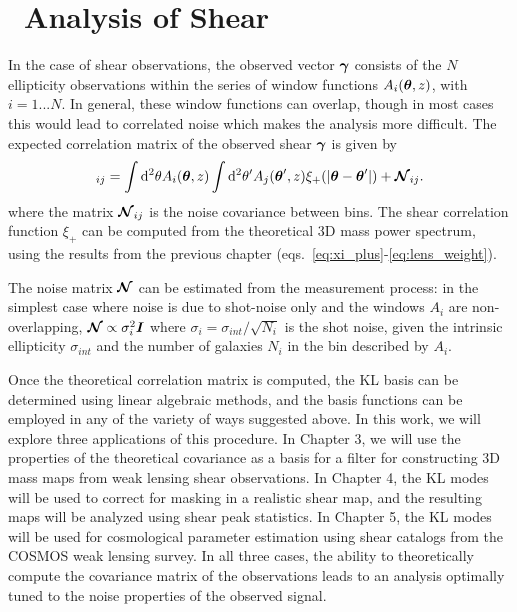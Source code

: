 \section{\KL\ Analysis of Shear}
\label{sec:KL_shear}
In the case of shear observations, the observed vector $\boldsymbol{\gamma}$
consists of the $N$ ellipticity observations within the series of window
functions $A_i(\boldsymbol{\theta}, z)$, with $i = 1...N$.  In general, these
window functions can overlap, though in most cases this would lead to
correlated noise which makes the analysis more difficult.
The expected correlation matrix of the
observed shear $\boldsymbol{\gamma}$ is given by
\begin{equation}
  [\mymat{\mathcal{C}_\gamma}]_{ij}
  = \int \dd^2\theta A_i(\myvec{\theta}, z)
  \int \dd^2\theta^\prime A_j(\myvec{\theta}^\prime, z)
  \xi_+(|\myvec{\theta} - \myvec{\theta}^\prime|) + \mymat{\mathcal{N}}_{ij}.
\end{equation}
where the matrix $\boldsymbol{\mathcal{N}}_{ij}$ is the noise covariance between
bins.  The shear correlation function $\xi_+$ can be computed from the
theoretical 3D mass power spectrum, using the results from the previous
chapter (eqs.~\ref{eq:xi_plus}-\ref{eq:lens_weight}).

The noise matrix $\boldsymbol{\mathcal{N}}$ can be estimated from the measurement
process: in the simplest case where noise is due to shot-noise only and
the windows $A_i$ are non-overlapping,
$\boldsymbol{\mathcal{N}} \propto \sigma_i^2 \boldsymbol{I}$
where $\sigma_i = \sigma_{int} / \sqrt{N_i}$ is the shot noise, given
the intrinsic ellipticity $\sigma_{int}$ and the number of galaxies $N_i$
in the bin described by $A_i$.

Once the theoretical correlation matrix is computed, the KL basis can be
determined using linear algebraic methods, and the basis functions can
be employed in any of the variety of ways suggested above.  In this work,
we will explore three applications of this procedure.  In Chapter 3, we
will use the properties of the theoretical covariance as a basis for
a filter for constructing 3D mass maps from weak lensing shear observations.
In Chapter 4, the KL modes will be used to correct for masking in a realistic
shear map, and the resulting maps will be analyzed using shear peak statistics.
In Chapter 5, the KL modes will be used for cosmological parameter estimation
using shear catalogs from the COSMOS weak lensing survey.  In all three cases,
the ability to theoretically compute the covariance matrix of the observations
leads to an analysis optimally tuned to the noise properties of the observed
signal.
